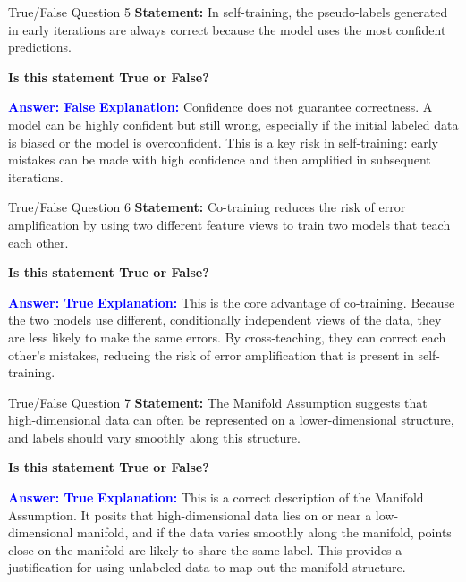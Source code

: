\documentclass[8pt]{beamer}  %
\begin{document}
	\begin{frame}{True/False Question 5}
		\textbf{Statement:} In self-training, the pseudo-labels generated in early iterations are always correct because the model uses the most confident predictions.
		
		\vspace{0.3cm}
		\textbf{Is this statement True or False?}
		
		\vspace{0.2cm}
		\textcolor{blue}{\textbf{Answer: False}}
		\vspace{0.2cm}
		\textcolor{blue}{\textbf{Explanation:}} Confidence does not guarantee correctness. A model can be highly confident but still wrong, especially if the initial labeled data is biased or the model is overconfident. This is a key risk in self-training: early mistakes can be made with high confidence and then amplified in subsequent iterations.
	\end{frame}
	
	\begin{frame}{True/False Question 6}
		\textbf{Statement:} Co-training reduces the risk of error amplification by using two different feature views to train two models that teach each other.
		
		\vspace{0.3cm}
		\textbf{Is this statement True or False?}
		
		\vspace{0.2cm}
		\textcolor{blue}{\textbf{Answer: True}}
		\vspace{0.2cm}
		\textcolor{blue}{\textbf{Explanation:}} This is the core advantage of co-training. Because the two models use different, conditionally independent views of the data, they are less likely to make the same errors. By cross-teaching, they can correct each other's mistakes, reducing the risk of error amplification that is present in self-training.
	\end{frame}
	
	\begin{frame}{True/False Question 7}
		\textbf{Statement:} The Manifold Assumption suggests that high-dimensional data can often be represented on a lower-dimensional structure, and labels should vary smoothly along this structure.
		
		\vspace{0.3cm}
		\textbf{Is this statement True or False?}
		
		\vspace{0.2cm}
		\textcolor{blue}{\textbf{Answer: True}}
		\vspace{0.2cm}
		\textcolor{blue}{\textbf{Explanation:}} This is a correct description of the Manifold Assumption. It posits that high-dimensional data lies on or near a low-dimensional manifold, and if the data varies smoothly along the manifold, points close on the manifold are likely to share the same label. This provides a justification for using unlabeled data to map out the manifold structure.
	\end{frame}
	
\end{document}

